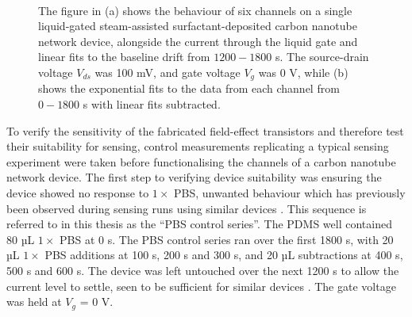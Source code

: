 \documentclass[
  a4paper,
]{scrbook}
\begin{document}
\begin{figure}
\begin{minipage}[t]{0.70\linewidth}
{{}

}

\end{minipage}%
%
\begin{minipage}[t]{0.15\linewidth}

{\centering 

~

}

\end{minipage}%

\caption[Salt concentration control series across six device channels,
with linear and exponential fits to the baseline drift of each
channel.]{\label{fig-salt-conc-control-series}The figure in (a) shows
the behaviour of six channels on a single liquid-gated steam-assisted
surfactant-deposited carbon nanotube network device, alongside the
current through the liquid gate and linear fits to the baseline drift
from \(1200-1800\) s. The source-drain voltage \(V_{ds}\) was 100 mV,
and gate voltage \(V_{g}\) was 0 V, while (b) shows the exponential fits
to the data from each channel from \(0-1800\) s with linear fits
subtracted.}

\end{figure}

To verify the sensitivity of the fabricated field-effect transistors and
therefore test their suitability for sensing, control measurements
replicating a typical sensing experiment were taken before
functionalising the channels of a carbon nanotube network device. The
first step to verifying device suitability was ensuring the device
showed no response to \(1 \times\) PBS, unwanted behaviour which has
previously been observed during sensing runs using similar devices
\autocite{Cassie2023}. This sequence is referred to in this thesis as
the ``PBS control series''. The PDMS well contained 80 µL \(1 \times\)
PBS at 0 s. The PBS control series ran over the first 1800 s, with 20 µL
\(1 \times\) PBS additions at 100 s, 200 s and 300 s, and 20 µL
subtractions at 400 s, 500 s and 600 s. The device was left untouched
over the next 1200 s to allow the current level to settle, seen to be
sufficient for similar devices \autocite{Cassie2023}. The gate voltage
was held at \(V_g\) = 0 V.
\end{document}

